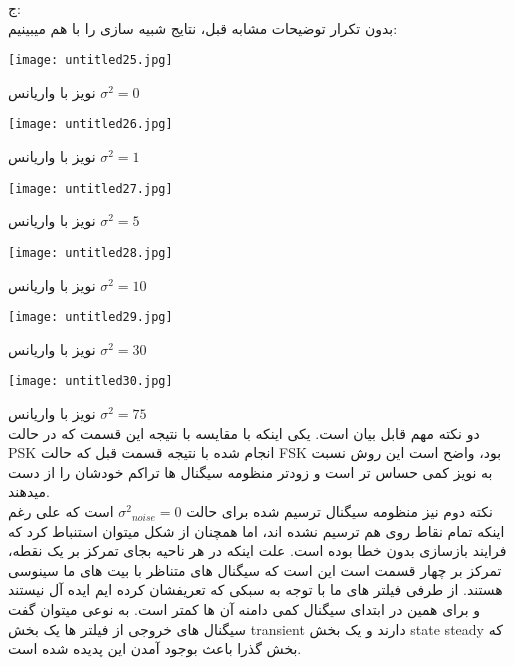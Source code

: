 ج:
\\
بدون تکرار توضیحات مشابه قبل، نتایج شبیه سازی را با هم میبینیم:

\begin{center}
    \texttt{[image: untitled25.jpg]}
\end{center}

\centering
نویز با واریانس ${\sigma}^2 = 0$
\\[1cm]


\begin{center}
    \texttt{[image: untitled26.jpg]}
\end{center}

\centering
نویز با واریانس ${\sigma}^2 = 1$
\\[0.5cm]


\begin{center}
    \texttt{[image: untitled27.jpg]}
\end{center}

\centering
نویز با واریانس ${\sigma}^2 = 5$
\\[1cm]


\begin{center}
    \texttt{[image: untitled28.jpg]}
\end{center}

\centering
نویز با واریانس ${\sigma}^2 = 10$
\\[0.5cm]


\begin{center}
    \texttt{[image: untitled29.jpg]}
\end{center}

\centering
نویز با واریانس ${\sigma}^2 = 30$
\\[1cm]


\begin{center}
    \texttt{[image: untitled30.jpg]}
\end{center}

\centering
نویز با واریانس ${\sigma}^2 = 75$
\\[0.5cm]

\justify
دو نکته مهم قابل بیان است. یکی اینکه با مقایسه با نتیجه این قسمت که در حالت PSK انجام شده با نتیجه قسمت قبل که حالت FSK بود، واضح است این روش نسبت به نویز کمی حساس تر است و زودتر منظومه سیگنال ها تراکم خودشان را از دست میدهند.
\\
نکته دوم نیز منظومه سیگنال ترسیم شده برای حالت ${\sigma^2}_{noise} = 0$ است که علی رغم اینکه تمام نقاط روی هم ترسیم نشده اند، اما همچنان از شکل میتوان استنباط کرد که فرایند بازسازی بدون خطا بوده است. علت اینکه در هر ناحیه بجای تمرکز بر یک نقطه، تمرکز بر چهار قسمت است این است که سیگنال های متناظر با بیت های ما سینوسی هستند. از طرفی فیلتر های ما با توجه به سبکی که تعریفشان کرده ایم ایده آل نیستند و برای همین در ابتدای سیگنال کمی دامنه آن ها کمتر است. به نوعی میتوان گفت سیگنال های خروجی از فیلتر ها یک بخش transient دارند و یک بخش state steady  که بخش گذرا باعث بوجود آمدن این پدیده شده است.


